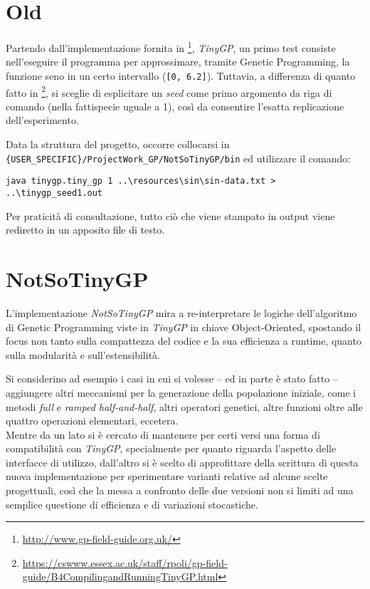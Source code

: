 \documentclass{../llncs}
\begin{document}
\section{Old}
Partendo dall'implementazione fornita in \footnote{\url{http://www.gp-field-guide.org.uk/}}, \emph{TinyGP}, un primo test consiste nell'eseguire il programma per approssimare, tramite Genetic Programming, la funzione seno in un certo intervallo (\texttt{[0, 6.2]}). Tuttavia, a differenza di quanto fatto in \footnote{\url{https://cswww.essex.ac.uk/staff/rpoli/gp-field-guide/B4CompilingandRunningTinyGP.html}}, si sceglie di esplicitare un \emph{seed} come primo argomento da riga di comando (nella fattispecie uguale a 1), così da consentire l'esatta replicazione dell'esperimento.

Data la struttura del progetto, occorre collocarsi in \texttt{\{USER\_SPECIFIC\}/ProjectWork\_GP/NotSoTinyGP/bin} ed utilizzare il comando:
\begin{lstlisting}[caption={Esecuzione di TinyGP da riga di comando}]
java tinygp.tiny_gp 1 ..\resources\sin\sin-data.txt > ..\tinygp_seed1.out
\end{lstlisting}
Per praticità di consultazione, tutto ciò che viene stampato in output viene rediretto in un apposito file di testo.

\section{NotSoTinyGP}
L'implementazione \emph{NotSoTinyGP} mira a re-interpretare le logiche dell'algoritmo di Genetic Programming viste in \emph{TinyGP} in chiave Object-Oriented, spostando il focus non tanto sulla compattezza del codice e la sua efficienza a runtime, quanto sulla modularità e sull'estensibilità.

Si considerino ad esempio i casi in cui si volesse -- ed in parte è stato fatto -- aggiungere altri meccanismi per la generazione della popolazione iniziale, come i metodi \emph{full} e \emph{ramped half-and-half}, altri operatori genetici, altre funzioni oltre alle quattro operazioni elementari, eccetera.\\

Mentre da un lato si è cercato di mantenere per certi versi una forma di compatibilità con \emph{TinyGP}, specialmente per quanto riguarda l'aspetto delle interfacce di utilizzo, dall'altro si è scelto di approfittare della scrittura di questa nuova implementazione per sperimentare varianti relative ad alcune scelte progettuali, così che la messa a confronto delle due versioni non si limiti ad una semplice questione di efficienza e di variazioni stocastiche.
\end{document}
